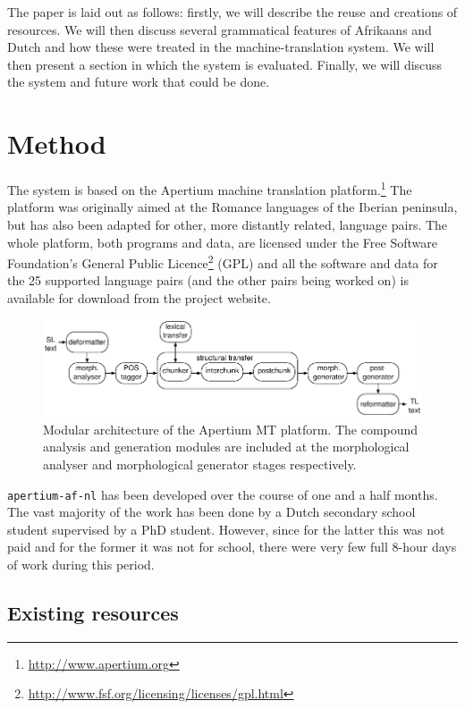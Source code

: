 \documentclass[11pt]{article}
\begin{document}
The paper is laid out as follows: firstly, we will describe the reuse and creations of 
resources. We will then discuss several grammatical features of Afrikaans and Dutch and how 
these were treated in the machine-translation system. We will then present a section 
in which the system is evaluated. Finally, we will discuss the system and future work that 
could be done.

\section{Method}

The system is based on the Apertium machine translation platform.\footnote{\url{http://www.apertium.org}} The
platform was originally aimed at the Romance languages of the Iberian
peninsula, but has also been adapted for other, more distantly related,
language pairs. The whole platform, both programs and data, are licensed
under the Free Software Foundation's General Public
Licence\footnote{\url{http://www.fsf.org/licensing/licenses/gpl.html}} (GPL)
and all the software and data for the 25 supported language pairs (and the
other pairs being worked on) is available for download from the project
website.

\begin{figure}
  \centering
  \includegraphics[scale=0.8]{apertium2.pdf}
  \caption{Modular architecture of the Apertium MT
    platform. The compound analysis and generation modules are included at the morphological
    analyser and morphological generator stages respectively.}
\label{fg:apertium}
\end{figure}

{\small {\tt apertium-af-nl}} has been developed over the course of one and a half months.
The vast majority of the work has been done by a Dutch secondary school student supervised 
by a PhD student. However, since for the latter this was not paid and for the former it was not for school, there were 
very few full 8-hour days of work during this period.

\subsection{Existing resources}
\end{document}
